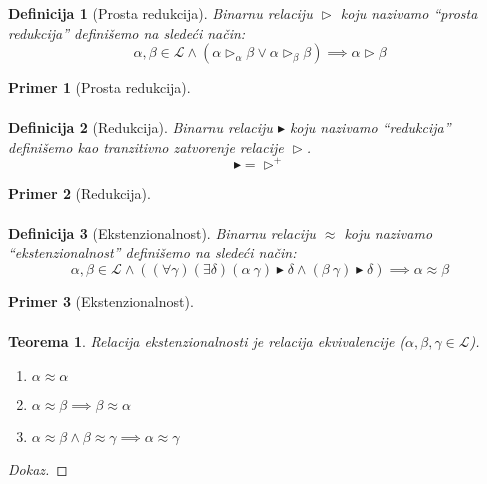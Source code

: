 \documentclass[10pt,a4paper,oneside]{article}
\newtheorem*{definition}{Definicija}
\newtheorem*{primer}{Primer}
\newtheorem{theorem}{Teorema}[section]
\begin{document}
    \begin{definition}[Prosta redukcija]
      Binarnu relaciju \(\vartriangleright\) koju nazivamo ``prosta redukcija'' defini\v{s}emo na slede\'{c}i na\v{c}in:
      \[
        \alpha, \beta \in \mathcal{L} \land
        (
          \alpha \vartriangleright_{\alpha} \beta \lor
          \alpha \vartriangleright_{\beta} \beta
        ) \implies
        \alpha \vartriangleright \beta
      \]
    \end{definition}
    \begin{primer}[Prosta redukcija]
      \begin{align*}
      \end{align*}
    \end{primer}

    \begin{definition}[Redukcija]
      Binarnu relaciju \(\blacktriangleright\) koju nazivamo ``redukcija'' defini\v{s}emo kao tranzitivno zatvorenje relacije \(\vartriangleright\).
      \[\blacktriangleright = \vartriangleright^{+}\]
    \end{definition}
    \begin{primer}[Redukcija]
      \begin{align*}
      \end{align*}
    \end{primer}

    \begin{definition}[Ekstenzionalnost]
      Binarnu relaciju \(\approx\) koju nazivamo ``ekstenzionalnost'' defini\v{s}emo na slede\'{c}i na\v{c}in:
      \[
        \alpha, \beta \in \mathcal{L} \land
        (
          (\forall \gamma) (\exists \delta)
          (\alpha\ \gamma) \blacktriangleright \delta \land
          (\beta\ \gamma) \blacktriangleright \delta
        ) \implies
        \alpha \approx \beta
      \]
    \end{definition}
    \begin{primer}[Ekstenzionalnost]
      \begin{align*}
      \end{align*}
    \end{primer}
    
    \begin{theorem}
      Relacija ekstenzionalnosti je relacija ekvivalencije (\(\alpha, \beta, \gamma \in \mathcal{L}\)).
      \begin{enumerate}
        \item \(\alpha \approx \alpha\)
        \item
          \(
            \alpha \approx \beta \implies
            \beta \approx \alpha
          \)
        \item
          \(
            \alpha \approx \beta \land
            \beta \approx \gamma \implies
            \alpha \approx \gamma
          \)
      \end{enumerate}
    \end{theorem}
    \begin{proof}[Dokaz]
    \end{proof}
\end{document}
